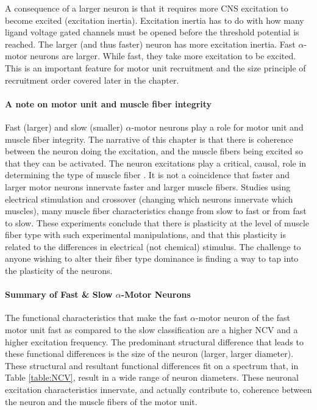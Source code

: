 A consequence of a larger neuron is that it requires more CNS excitation to become excited (excitation inertia). Excitation inertia has to do with how many ligand voltage gated channels must be opened before the threshold potential is reached. The larger (and thus faster) neuron has more excitation inertia. Fast $\alpha$-motor neurons are larger. While fast, they take more excitation to be excited. This is an important feature for motor unit recruitment and the size principle of recruitment order covered later in the chapter.

\paragraph{A note on motor unit and muscle fiber integrity}
Fast (larger) and slow (smaller) $\alpha$-motor neurons play a role for motor unit and muscle fiber integrity. The narrative of this chapter is that there is coherence between the neuron doing the excitation, and the muscle fibers being excited so that they can be activated. The neuron excitations play a critical, causal, role in determining the type of muscle fiber \cite{buchthal_motor_1980}. It is not a coincidence that faster and larger motor neurons innervate faster and larger muscle fibers. Studies using electrical stimulation and crossover (changing which neurons innervate which muscles), many muscle fiber characteristics change from slow to fast or from fast to slow. These experiments conclude that there is plasticity at the level of muscle fiber type with such experimental manipulations, and that this plasticity is related to the differences in electrical (not chemical) stimulus. The challenge to anyone wishing to alter their fiber type dominance is finding a way to  tap into the plasticity of the neurons.\footnotemark{}

\paragraph{Summary of Fast \& Slow $\alpha$-Motor Neurons}
The functional characteristics that make the fast $\alpha$-motor neuron of the fast motor unit fast as compared to the slow classification are a higher NCV and a higher excitation frequency. The predominant structural difference that leads to these functional differences is the size of the neuron (larger, larger diameter). These structural and resultant functional differences fit on a spectrum that, in Table \ref{table:NCV}, result in a wide range of neuron diameters. These neuronal excitation characteristics innervate, and actually contribute to, coherence between the neuron and the muscle fibers of the motor unit.


